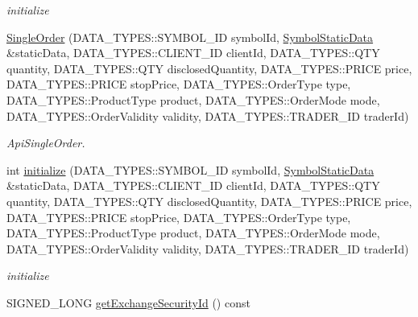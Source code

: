 \begin{DoxyCompactItemize}
\begin{DoxyCompactList}\small\item\em initialize \end{DoxyCompactList}\item 
\hyperlink{class_a_p_i2_1_1_single_order_a424d34ffce1d177299afb602ac1b3588}{Single\-Order} (D\-A\-T\-A\-\_\-\-T\-Y\-P\-E\-S\-::\-S\-Y\-M\-B\-O\-L\-\_\-\-I\-D symbol\-Id, \hyperlink{struct_a_p_i2_1_1_symbol_static_data}{Symbol\-Static\-Data} \&static\-Data, D\-A\-T\-A\-\_\-\-T\-Y\-P\-E\-S\-::\-C\-L\-I\-E\-N\-T\-\_\-\-I\-D client\-Id, D\-A\-T\-A\-\_\-\-T\-Y\-P\-E\-S\-::\-Q\-T\-Y quantity, D\-A\-T\-A\-\_\-\-T\-Y\-P\-E\-S\-::\-Q\-T\-Y disclosed\-Quantity, D\-A\-T\-A\-\_\-\-T\-Y\-P\-E\-S\-::\-P\-R\-I\-C\-E price, D\-A\-T\-A\-\_\-\-T\-Y\-P\-E\-S\-::\-P\-R\-I\-C\-E stop\-Price, D\-A\-T\-A\-\_\-\-T\-Y\-P\-E\-S\-::\-Order\-Type type, D\-A\-T\-A\-\_\-\-T\-Y\-P\-E\-S\-::\-Product\-Type product, D\-A\-T\-A\-\_\-\-T\-Y\-P\-E\-S\-::\-Order\-Mode mode, D\-A\-T\-A\-\_\-\-T\-Y\-P\-E\-S\-::\-Order\-Validity validity, D\-A\-T\-A\-\_\-\-T\-Y\-P\-E\-S\-::\-T\-R\-A\-D\-E\-R\-\_\-\-I\-D trader\-Id)
\begin{DoxyCompactList}\small\item\em Api\-Single\-Order. \end{DoxyCompactList}\item 
int \hyperlink{class_a_p_i2_1_1_single_order_a75ec4c26d9fbe24655e858b3a19c34a9}{initialize} (D\-A\-T\-A\-\_\-\-T\-Y\-P\-E\-S\-::\-S\-Y\-M\-B\-O\-L\-\_\-\-I\-D symbol\-Id, \hyperlink{struct_a_p_i2_1_1_symbol_static_data}{Symbol\-Static\-Data} \&static\-Data, D\-A\-T\-A\-\_\-\-T\-Y\-P\-E\-S\-::\-C\-L\-I\-E\-N\-T\-\_\-\-I\-D client\-Id, D\-A\-T\-A\-\_\-\-T\-Y\-P\-E\-S\-::\-Q\-T\-Y quantity, D\-A\-T\-A\-\_\-\-T\-Y\-P\-E\-S\-::\-Q\-T\-Y disclosed\-Quantity, D\-A\-T\-A\-\_\-\-T\-Y\-P\-E\-S\-::\-P\-R\-I\-C\-E price, D\-A\-T\-A\-\_\-\-T\-Y\-P\-E\-S\-::\-P\-R\-I\-C\-E stop\-Price, D\-A\-T\-A\-\_\-\-T\-Y\-P\-E\-S\-::\-Order\-Type type, D\-A\-T\-A\-\_\-\-T\-Y\-P\-E\-S\-::\-Product\-Type product, D\-A\-T\-A\-\_\-\-T\-Y\-P\-E\-S\-::\-Order\-Mode mode, D\-A\-T\-A\-\_\-\-T\-Y\-P\-E\-S\-::\-Order\-Validity validity, D\-A\-T\-A\-\_\-\-T\-Y\-P\-E\-S\-::\-T\-R\-A\-D\-E\-R\-\_\-\-I\-D trader\-Id)
\begin{DoxyCompactList}\small\item\em initialize \end{DoxyCompactList}\item 
S\-I\-G\-N\-E\-D\-\_\-\-L\-O\-N\-G \hyperlink{class_a_p_i2_1_1_single_order_aab369ee83666d5a8866b076d922162fa}{get\-Exchange\-Security\-Id} () const 

\end{DoxyCompactItemize}
